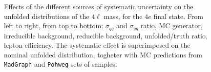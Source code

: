\begin{figure}[hbtp]
\begin{center}
    \caption{Effects of the different sources of systematic uncertainty on the unfolded distributions of the $4\ell$ mass, for the     
    $4e$ final state. From left to right, from top to bottom: $\sigma_{qq}$ and $\sigma_{gg}$ ratio, MC generator, irreducible background,
reducible background, unfolded/truth ratio, lepton efficiency. The systematic effect is superimposed on the nominal unfolded distribution, togheter with MC predictions from \texttt{MadGraph} and \texttt{Pohweg} sets of samples.}
    \label{fig:Mass_syst_4e}
  \end{center}
\end{figure}


